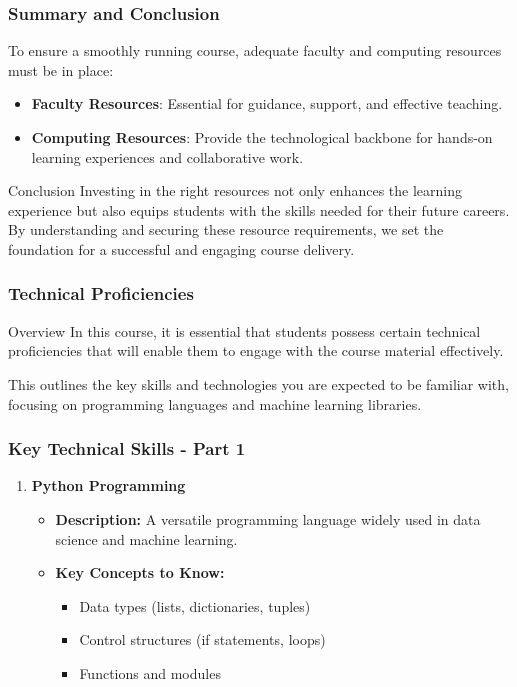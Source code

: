 \documentclass[aspectratio=169]{beamer}
\begin{document}
\begin{frame}[fragile]
    \frametitle{Summary and Conclusion}
    To ensure a smoothly running course, adequate faculty and computing resources must be in place:
    \begin{itemize}
        \item \textbf{Faculty Resources}: Essential for guidance, support, and effective teaching.
        \item \textbf{Computing Resources}: Provide the technological backbone for hands-on learning experiences and collaborative work.
    \end{itemize}
    \begin{block}{Conclusion}
        Investing in the right resources not only enhances the learning experience but also equips students with the skills needed for their future careers. By understanding and securing these resource requirements, we set the foundation for a successful and engaging course delivery.
    \end{block}
\end{frame}

\begin{frame}
    \frametitle{Technical Proficiencies}
    \begin{block}{Overview}
        In this course, it is essential that students possess certain technical proficiencies that will enable them to engage with the course material effectively. 
    \end{block}
    This outlines the key skills and technologies you are expected to be familiar with, focusing on programming languages and machine learning libraries.
\end{frame}

\begin{frame}
    \frametitle{Key Technical Skills - Part 1}
    \begin{enumerate}
        \item \textbf{Python Programming}
        \begin{itemize}
            \item \textbf{Description:} A versatile programming language widely used in data science and machine learning.
            \item \textbf{Key Concepts to Know:}
            \begin{itemize}
                \item Data types (lists, dictionaries, tuples)
                \item Control structures (if statements, loops)
                \item Functions and modules
            \end{itemize}
        \end{itemize}
    \end{enumerate}
\end{frame}
\end{document}
